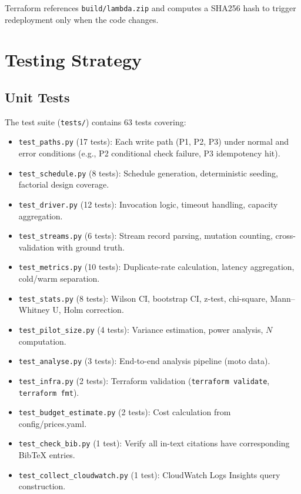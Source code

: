 Terraform references \texttt{build/lambda.zip} and computes a SHA256 hash to trigger redeployment only when the code changes.

\section{Testing Strategy}

\subsection{Unit Tests}

The test suite (\texttt{tests/}) contains 63 tests covering:

\begin{itemize}
    \item \texttt{test\_paths.py} (17 tests): Each write path (P1, P2, P3) under normal and error conditions (e.g., P2 conditional check failure, P3 idempotency hit).
    \item \texttt{test\_schedule.py} (8 tests): Schedule generation, deterministic seeding, factorial design coverage.
    \item \texttt{test\_driver.py} (12 tests): Invocation logic, timeout handling, capacity aggregation.
    \item \texttt{test\_streams.py} (6 tests): Stream record parsing, mutation counting, cross-validation with ground truth.
    \item \texttt{test\_metrics.py} (10 tests): Duplicate-rate calculation, latency aggregation, cold/warm separation.
    \item \texttt{test\_stats.py} (8 tests): Wilson CI, bootstrap CI, z-test, chi-square, Mann–Whitney U, Holm correction.
    \item \texttt{test\_pilot\_size.py} (4 tests): Variance estimation, power analysis, $N$ computation.
    \item \texttt{test\_analyse.py} (3 tests): End-to-end analysis pipeline (moto data).
    \item \texttt{test\_infra.py} (2 tests): Terraform validation (\texttt{terraform validate}, \texttt{terraform fmt}).
    \item \texttt{test\_budget\_estimate.py} (2 tests): Cost calculation from config/prices.yaml.
    \item \texttt{test\_check\_bib.py} (1 test): Verify all in-text citations have corresponding BibTeX entries.
    \item \texttt{test\_collect\_cloudwatch.py} (1 test): CloudWatch Logs Insights query construction.
\end{itemize}


